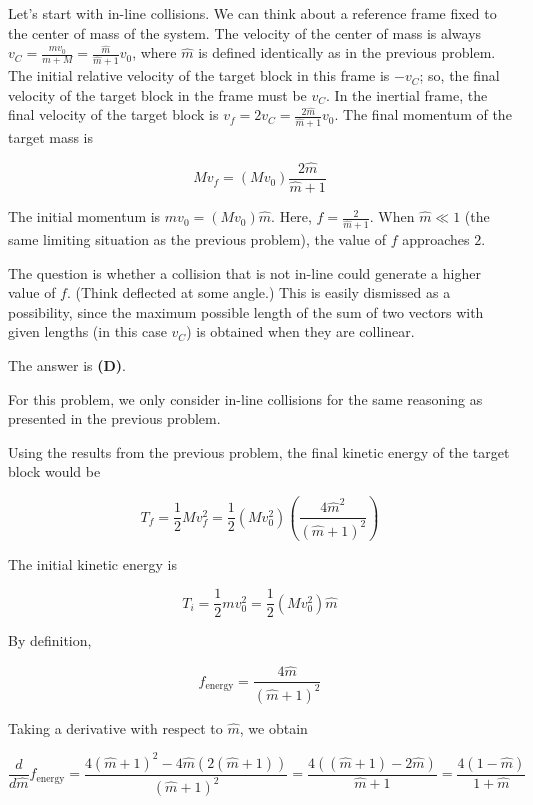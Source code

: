 \documentclass[12pt]{article}
\begin{document}
Let's start with in-line collisions. We can think about a reference frame fixed to the center of mass of the system. The velocity of the center of mass is always $v_C = \frac{m v_0}{m + M} = \frac{\hat{m}}{\hat{m} + 1} v_0$, where $\hat{m}$ is defined identically as in the previous problem. The initial relative velocity of the target block in this frame is $-v_C$; so, the final velocity of the target block in the frame must be $v_C$. In the inertial frame, the final velocity of the target block is $v_f = 2 v_C = \frac{2 \hat{m}}{\hat{m} + 1} v_0$. The final momentum of the target mass is

$$M v_f = (M v_0) \frac{2 \hat{m}}{\hat{m} + 1}$$

The initial momentum is $m v_0 = (M v_0) \hat{m}$. Here, $f = \frac{2}{\hat{m} + 1}$. When $\hat{m} \ll 1$ (the same limiting situation as the previous problem), the value of $f$ approaches $2$.

The question is whether a collision that is not in-line could generate a higher value of $f$. (Think deflected at some angle.) This is easily dismissed as a possibility, since the maximum possible length of the sum of two vectors with given lengths (in this case $v_C$) is obtained when they are collinear.

The answer is \textbf{(D)}.


\vspace{2 \baselineskip}



For this problem, we only consider in-line collisions for the same reasoning as presented in the previous problem.

Using the results from the previous problem, the final kinetic energy of the target block would be

$$T_f = \frac{1}{2} M v_f^2 = \frac{1}{2} (M v_0^2) \left( \frac{4 \hat{m}^2}{(\hat{m} + 1)^2} \right)$$

The initial kinetic energy is

$$T_i = \frac{1}{2} m v_0^2 = \frac{1}{2} (M v_0^2) \hat{m}$$

By definition,

$$f_\text{energy} = \frac{4 \hat{m}}{(\hat{m} + 1)^2}$$

Taking a derivative with respect to $\hat{m}$, we obtain

$$\frac{d }{d \hat{m}} f_\text{energy} = \frac{4 (\hat{m} + 1)^2 - 4 \hat{m} \left( 2 (\hat{m} + 1) \right)}{(\hat{m} + 1)^2} = \frac{4 \left( (\hat{m} + 1) - 2 \hat{m} \right)}{\hat{m} + 1} = \frac{4 (1 - \hat{m})}{1 + \hat{m}}$$
\end{document}
